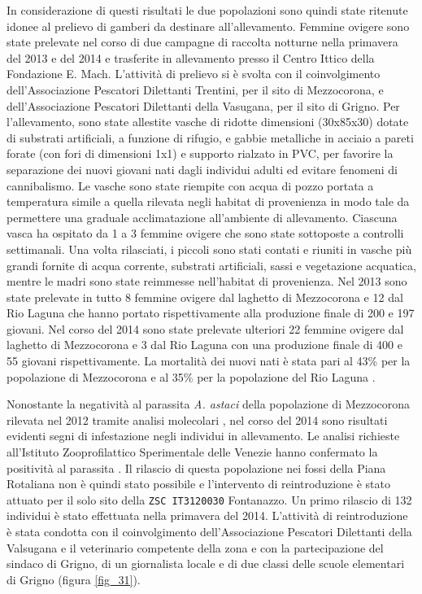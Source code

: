 \documentclass[11pt,a4paper,italian,twoside,openany]{memoir}
\begin{document}
In considerazione di questi risultati le due popolazioni sono quindi state ritenute idonee al prelievo di gamberi da destinare all'allevamento. Femmine ovigere sono state prelevate nel corso di due campagne di raccolta notturne nella primavera del 2013 e del 2014 e trasferite in allevamento presso il Centro Ittico della Fondazione E. Mach. L'attività di prelievo si è svolta con il coinvolgimento dell'Associazione Pescatori Dilettanti Trentini, per il sito di Mezzocorona, e dell'Associazione Pescatori Dilettanti della Vasugana, per il sito di Grigno. Per l'allevamento, sono state allestite vasche di ridotte dimensioni (30x85x30) dotate di substrati artificiali, a funzione di rifugio, e gabbie metalliche in acciaio a pareti forate (con fori di dimensioni 1x1) e supporto rialzato in PVC, per favorire la separazione dei nuovi giovani nati dagli individui adulti ed evitare fenomeni di cannibalismo. Le vasche sono state riempite con acqua di pozzo portata a temperatura simile a quella rilevata negli habitat di provenienza in modo tale da permettere una graduale acclimatazione all'ambiente di allevamento. Ciascuna vasca ha ospitato da 1 a 3 femmine ovigere che sono state sottoposte a controlli settimanali. Una volta rilasciati, i piccoli sono stati contati e riuniti in vasche più grandi fornite di acqua corrente, substrati artificiali, sassi e vegetazione acquatica, mentre le madri sono state reimmesse nell'habitat di provenienza. Nel 2013 sono state prelevate in tutto 8 femmine ovigere dal laghetto di Mezzocorona e 12 dal Rio Laguna che hanno portato rispettivamente alla produzione finale di 200 e 197 giovani. Nel corso del 2014 sono state prelevate ulteriori 22 femmine ovigere dal laghetto di Mezzocorona e 3 dal Rio Laguna con una produzione finale di 400 e 55 giovani rispettivamente. La mortalità dei nuovi nati è stata pari al 43\% per la popolazione di Mezzocorona e al 35\% per la popolazione del Rio Laguna \cite{Maiolini 2014} \cite{Cappelletti 2016}.

Nonostante la negatività al parassita \emph{A. astaci} della popolazione di Mezzocorona rilevata nel 2012 tramite analisi molecolari \cite{Minghetti 2012b}, nel corso del 2014 sono risultati evidenti segni di infestazione negli individui in allevamento. Le analisi richieste all'Istituto Zooprofilattico Sperimentale delle Venezie hanno confermato la positività al parassita \cite{Cappelletti 2016}. Il rilascio di questa popolazione nei fossi della Piana Rotaliana non è quindi stato possibile e l'intervento di reintroduzione è stato attuato per il solo sito della \texttt{ZSC IT3120030} Fontanazzo. Un primo rilascio di 132 individui è stato effettuata nella primavera del 2014. L'attività di reintroduzione è stata condotta con il coinvolgimento dell'Associazione Pescatori Dilettanti della Valsugana e il veterinario competente della zona e con la partecipazione del sindaco di Grigno, di un giornalista locale e di due classi delle scuole elementari di Grigno \cite{Maiolini 2014} (figura \ref{fig_31}).
\end{document}
